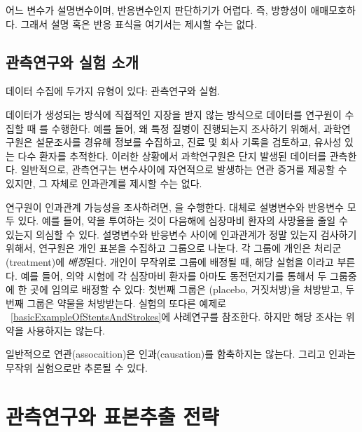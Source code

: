 어느 변수가 설명변수이며, 반응변수인지 판단하기가 어렵다. 즉, 방향성이 애매모호하다. 그래서 설명 혹은 반응 표식을 여기서는 제시할 수는 없다.


\subsection{관측연구와 실험 소개}

데이터 수집에 두가지 유형이 있다: 관측연구와 실험.

데이터가 생성되는 방식에 직접적인 지장을 받지 않는 방식으로 데이터를 연구원이 수집할 때 를 수행한다.
예를 들어, 왜 특정 질병이 진행되는지 조사하기 위해서, 과학연구원은 설문조사를 경유해 정보를 수집하고, 진료 및 회사 기록을 검토하고, 
유사성 있는 다수  환자를 추적한다.
이러한 상황에서 과학연구원은 단지 발생된 데이터를 관측한다.
일반적으로, 관측연구는 변수사이에 자연적으로 발생하는 연관 증거를 제공할 수 있지만, 그 자체로 인과관계를 제시할 수는 없다.

연구원이 인과관계 가능성을 조사하려면, 을 수행한다.
대체로 설병변수와 반응변수 모두 있다.
예를 들어, 약을 투여하는 것이 다음해에 심장마비 환자의 사망율을 줄일 수 있는지 의심할 수 있다.
설명변수와 반응변수 사이에 인과관계가 정말 있는지 검사하기 위해서, 연구원은 개인 표본을 수집하고 그룹으로 나눈다.
각 그룹에 개인은 처리군(treatment)에 \emph{배정}된다. 개인이 무작위로 그룹에 배정될 때, 해당 실험을 이라고 부른다.
예를 들어, 의약 시험에 각 심장마비 환자를 아마도 동전던지기를 통해서 두 그룹중에 한 곳에 임의로 배정할 수 있다:
첫번째 그룹은  (placebo, 거짓처방)을 처방받고, 두번째 그룹은 약물을 처방받는다.
실험의 또다른 예제로 ~\ref{basicExampleOfStentsAndStrokes}에 사례연구를 참조한다. 하지만 해당 조사는 위약을 사용하지는 않는다.



\begin{tipBox}{
일반적으로 연관(assocaition)은 인과(causation)를 함축하지는 않는다. 그리고 인과는 무작위 실험으로만 추론될 수 있다.}
\end{tipBox}


\section[Observational studies and sampling strategies]{관측연구와 표본추출 전략 }

